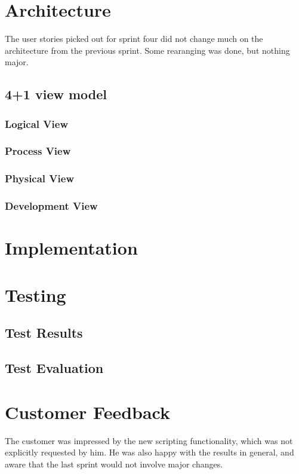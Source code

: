 \section{Architecture}
The user stories picked out for sprint four did not change much on the architecture from the previous sprint. Some rearanging was done, but nothing major.

\subsection{4+1 view model}
\subsubsection{Logical View}
\subsubsection{Process View}
\subsubsection{Physical View}
\subsubsection{Development View}

\section{Implementation}

\section{Testing}
\subsection{Test Results}
\subsection{Test Evaluation}

\section{Customer Feedback}
The customer was impressed by the new scripting functionality, which was not explicitly requested by him. He was also happy with the results in general, and aware that the last sprint would not involve major changes.


